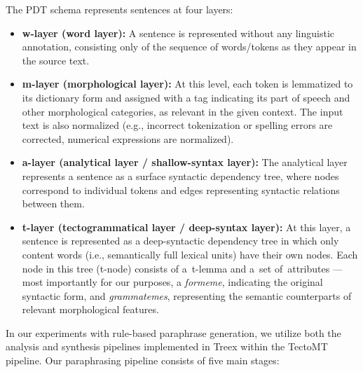 The PDT schema represents sentences at four layers: 

\begin{itemize}
\item \textbf{w-layer (word layer):} A sentence is represented without any linguistic annotation, consisting only of the sequence of words/tokens as they appear in the source text.
\item \textbf{m-layer (morphological layer):} At this level, each token is lemmatized to its dictionary form and assigned with a tag indicating its part of speech and other morphological categories, as relevant in the given context. The input text is also normalized (e.g., incorrect tokenization or spelling errors are corrected, numerical expressions are normalized).
\item \textbf{a-layer (analytical layer / shallow-syntax layer):} The analytical layer represents a sentence as a surface syntactic dependency tree, where nodes correspond to individual tokens and edges representing syntactic relations between them.
\item \textbf{t-layer (tectogrammatical layer / deep-syntax layer):} At this layer, a sentence is represented as a deep-syntactic dependency tree in which only content words (i.e., semantically full lexical units) have their own nodes. Each node in this tree (t-node) consists of a~t-lemma and a~set of~attributes --- most importantly for our purposes, a \textit{formeme}, indicating the original syntactic form, and \textit{grammatemes}, representing the semantic counterparts of relevant morphological features.
\end{itemize}

In our experiments with rule-based paraphrase generation, we utilize both the analysis and synthesis pipelines implemented in Treex within the TectoMT pipeline. Our paraphrasing pipeline consists of five main stages:

